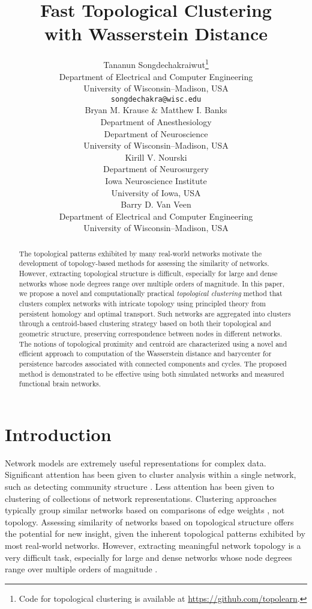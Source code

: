 \documentclass{article} %
\title{Fast Topological Clustering \\with Wasserstein Distance}
\author{Tananun Songdechakraiwut\thanks{Code for topological clustering is available at \url{https://github.com/topolearn}.} \\
Department of Electrical and Computer Engineering \\
University of Wisconsin--Madison, USA \\
\texttt{songdechakra@wisc.edu} \\
\And
Bryan M. Krause \& Matthew I. Banks \\
Department of Anesthesiology \\
Department of Neuroscience \\
University of Wisconsin--Madison, USA \\
\And
Kirill V. Nourski \\
Department of Neurosurgery \\
Iowa Neuroscience Institute \\
University of Iowa, USA \\
\And
Barry D. Van Veen \\
Department of Electrical and Computer Engineering \\
University of Wisconsin--Madison, USA
}
\begin{document}
\maketitle

\begin{abstract}
The topological patterns exhibited by many real-world networks motivate the development of topology-based methods for assessing the similarity of networks.
However, extracting topological structure is difficult, especially for large and dense networks whose node degrees range over multiple orders of magnitude.
In this paper, we propose a novel and computationally practical {\em topological clustering} method that clusters complex networks with intricate topology using principled theory from persistent homology and optimal transport. 
Such networks are aggregated into clusters through a centroid-based clustering strategy based on both their topological and geometric structure, preserving correspondence between nodes in different networks.
The notions of topological proximity and centroid are characterized using a novel and efficient approach to computation of the Wasserstein distance and barycenter for persistence barcodes associated with connected components and cycles.
The proposed method is demonstrated to be effective using both simulated networks and measured functional brain networks.
\end{abstract}



\section{Introduction}
Network models are extremely useful representations for complex data. Significant attention has been given to cluster analysis within a single network, such as detecting community structure \citep{newman2006modularity,rohe2011spectral,yin2017local}. 
Less attention has been given to clustering of collections of network representations.  Clustering approaches typically group similar networks based on comparisons of edge weights \citep{xu2005survey}, not topology. Assessing similarity of networks based on topological structure offers the potential for new insight, given the inherent topological patterns exhibited by most real-world networks. However, extracting meaningful network topology is a very difficult task, especially for large and dense networks whose node degrees range over multiple orders of magnitude \citep{barrat2004architecture,bullmore2009complex,honey2007network}.
\end{document}
